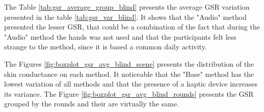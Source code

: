 The Table \ref{tab:gsr_average_group_blind} presents the average GSR variation presented in the table \ref{tab:gsr_var_blind}. It shows that the "Audio" method presented the lesser GSR, that could be a combination of the fact that during the "Audio" method the hands was not used and that the participants felt less strange to the method, since it is based a common daily activity.



The Figures \ref{fig:boxplot_gsr_avg_blind_scene} presents the distribution of the skin conductance on each method. It noticeable that the "Base" method has the lowest variation of all methods and that the presence of a haptic device increases its variance. The Figure \ref{fig:boxplot_gsr_avg_blind_rounds} presents the GSR grouped by the rounds and their are virtually the same.

